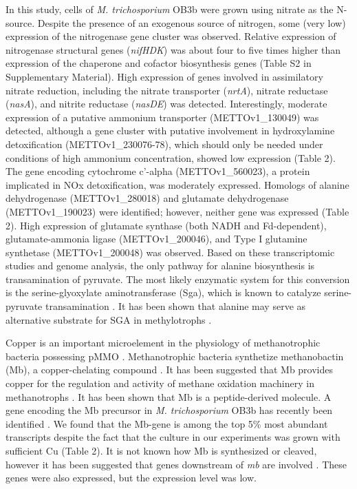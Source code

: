 In this study, cells of \textit{M. trichosporium} OB3b were grown using nitrate as the N-source.
Despite the presence of an exogenous source of nitrogen, some (very low) expression of the nitrogenase gene cluster was observed.
Relative expression of nitrogenase structural genes (\textit{nifHDK}) was about four to five times higher than expression of the chaperone and cofactor biosynthesis genes (Table S2 in Supplementary Material).
High expression of genes involved in assimilatory nitrate reduction, including the nitrate transporter (\textit{nrtA}), nitrate reductase (\textit{nasA}), and nitrite reductase (\textit{nasDE}) was detected.
Interestingly, moderate expression of a putative ammonium transporter (METTOv1\_130049) was detected, although a gene cluster with putative involvement in hydroxylamine detoxification (METTOv1\_230076-78), which should only be needed under conditions of high ammonium concentration, showed low expression (Table 2).
The gene encoding cytochrome c'-alpha (METTOv1\_560023), a protein implicated in NOx detoxification, was moderately expressed.
Homologs of alanine dehydrogenase (METTOv1\_280018) and glutamate dehydrogenase (METTOv1\_190023) were identified; however, neither gene was expressed (Table 2).
High expression of glutamate synthase (both NADH and Fd-dependent), glutamate-ammonia ligase (METTOv1\_200046), and Type I glutamine synthetase (METTOv1\_200048) was observed.
Based on these transcriptomic studies and genome analysis, the only pathway for alanine biosynthesis is transamination of pyruvate.
The most likely enzymatic system for this conversion is the serine-glyoxylate aminotransferase (Sga), which is known to catalyze serine-pyruvate transamination \cite{liepman2001}.
It has been shown that alanine may serve as alternative substrate for SGA in methylotrophs \cite{karsten2001}.

Copper is an important microelement in the physiology of methanotrophic bacteria possessing pMMO \cite{anthony1982}.
Methanotrophic bacteria synthetize methanobactin (Mb), a copper-chelating compound \cite{kim2004, balasubramanian2008, semrau2010}.
It has been suggested that Mb provides copper for the regulation and activity of methane oxidation machinery in methanotrophs \cite{balasubramanian2010, semrau2010}.
It has been shown that Mb is a peptide-derived molecule.
A gene encoding the Mb precursor in \textit{M. trichosporium} OB3b has recently been identified \cite{krentz2010}.
We found that the Mb-gene is among the top 5\% most abundant transcripts despite the fact that the culture in our experiments was grown with sufficient Cu (Table 2).
It is not known how Mb is synthesized or cleaved, however it has been suggested that genes downstream of \textit{mb} are involved \cite{krentz2010}.
These genes were also expressed, but the expression level was low.

